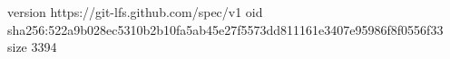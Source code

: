 version https://git-lfs.github.com/spec/v1
oid sha256:522a9b028ec5310b2b10fa5ab45e27f5573dd811161e3407e95986f8f0556f33
size 3394
